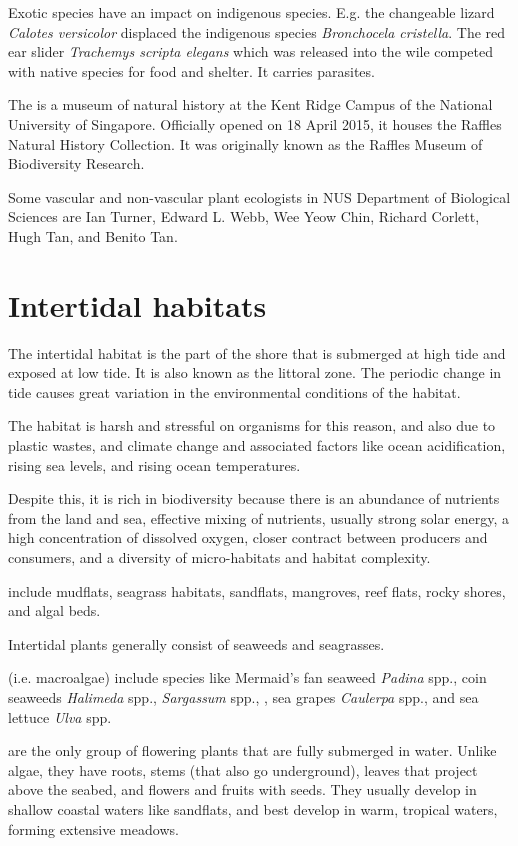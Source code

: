 \documentclass{slnotes}
\newcommand{\scn}[1]{\textit{#1}}
\begin{document}
Exotic species have an impact on indigenous species. E.g. the changeable lizard \scn{Calotes versicolor} displaced the indigenous species \scn{Bronchocela cristella}. The red ear slider \scn{Trachemys scripta elegans} which was released into the wile competed with native species for food and shelter. It carries parasites.

The  is a museum of natural history at the Kent Ridge Campus of the National University of Singapore. Officially opened on 18 April 2015, it houses the Raffles Natural History Collection. It was originally known as the Raffles Museum of Biodiversity Research.

Some vascular and non-vascular plant ecologists in NUS Department of Biological Sciences are Ian Turner, Edward L. Webb, Wee Yeow Chin, Richard Corlett, Hugh Tan, and Benito Tan.
\chapter{Intertidal habitats}
The intertidal habitat is the part of the shore that is submerged at high tide and exposed at low tide. It is also known as the littoral zone. The periodic change in tide causes great variation in the environmental conditions of the habitat.

The habitat is harsh and stressful on organisms for this reason, and also due to plastic wastes, and climate change and associated factors like ocean acidification, rising sea levels, and rising ocean temperatures.

Despite this, it is rich in biodiversity because there is an abundance of nutrients from the land and sea, effective mixing of nutrients, usually strong solar energy, a high concentration of dissolved oxygen, closer contract between producers and consumers, and a diversity of micro-habitats and habitat complexity.

 include mudflats, seagrass habitats, sandflats, mangroves, reef flats, rocky shores, and algal beds.

Intertidal plants generally consist of seaweeds and seagrasses.

 (i.e. macroalgae) include species like Mermaid's fan seaweed \scn{Padina} spp., coin seaweeds \scn{Halimeda} spp., \scn{Sargassum} spp., , sea grapes \scn{Caulerpa} spp., and sea lettuce \scn{Ulva} spp.

 are the only group of flowering plants that are fully submerged in water. Unlike algae, they have roots, stems (that also go underground), leaves that project above the seabed, and flowers and fruits with seeds. They usually develop in shallow coastal waters like sandflats, and best develop in warm, tropical waters, forming extensive meadows.
\end{document}
